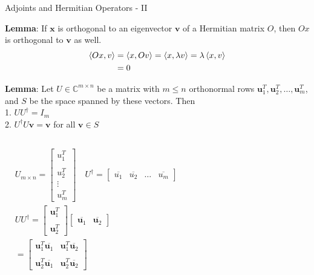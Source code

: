 \documentclass{beamer}
\begin{document}
\begin{frame}{Adjoints and Hermitian Operators - II\tiny{\cite{thespectraltheoremforhermitianmatrice}}}
  {\tiny
    \textbf{Lemma}: If $\mathbf{x}$ is orthogonal to an eigenvector $\mathbf{v}$ of a Hermitian matrix $O$, then $Ox$ is orthogonal to $\mathbf{v}$ as well. \\
    \begin{align*}
      \braket{Ox, v} &= \braket{x, Ov} = \braket{x, \lambda v} = \lambda \braket{x, v} \\
                     & = 0
    \end{align*}

    \vspace{0.3cm}
    \textbf{Lemma}: Let $U \in \mathbb{C}^{m \times n}$ be a matrix
    with $m \leq n$ orthonormal rows $\mathbf{u}_1^{T}, \mathbf{u}_2^{T}, \dots, \mathbf{u}_m^{T}$,
    and $S$ be the space spanned by these vectors. Then \\
    1. $UU^{\dagger} = I_m$ \\
    2. $U^{\dagger}U\mathbf{v} = \mathbf{v}$ for all $\mathbf{v} \in S$
    \begin{columns}
    \begin{align*}
      &U_{m \times n} =
      \begin{bmatrix}
        u_1^T \\
        \\
        u_2^T \\
        \vdots \\
        u_m^T
      \end{bmatrix}  \quad
      U^{\dagger} =
      \begin{bmatrix}
        \overline{u_1} & \overline{u_2} & \ldots & \overline{u_m}
      \end{bmatrix} \\
      &UU^{\dagger}
      =
      \begin{bmatrix}
        \mathbf{u}_1^T \\
        \\
        \mathbf{u}_2^T
      \end{bmatrix}
      \begin{bmatrix}
        \overline{\mathbf{u}_1} & \overline{\mathbf{u}_2}
      \end{bmatrix} \\
      &= 
      \begin{bmatrix}
        \mathbf{u}_1^T \overline{\mathbf{u}_1} & \mathbf{u}_1^T \overline{\mathbf{u}_2} \\
        \\
        \mathbf{u}_2^T \overline{\mathbf{u}_1} & \mathbf{u}_2^T \overline{\mathbf{u}_2}
      \end{bmatrix}
    \end{align*}


\end{columns}}
\end{frame}
\end{document}
